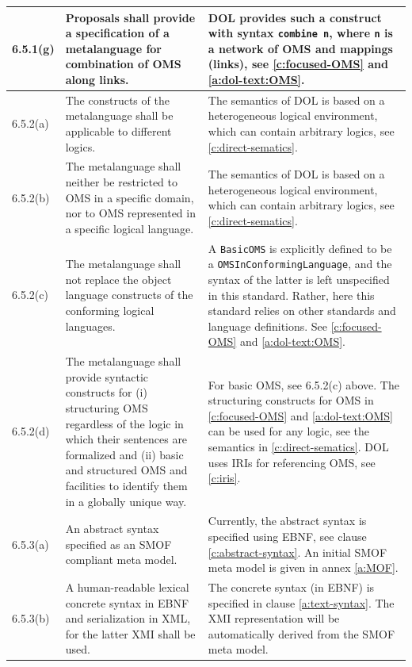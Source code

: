 \documentclass[10pt,fleqn,%
\ifpretendfinal
final%
\else
draft%
\fi,
]{scrreprt}
\newcommand*{\syntax}[1]{\texttt{#1}}
\begin{document}
\begin{center}
\begin{longtable}{|p{}|p{}|p{}|}
	\\ \hline
%
6.5.1(g) & 
Proposals shall provide a specification of a metalanguage for combination of OMS along links. 	&
DOL provides such a construct with syntax \syntax{combine n}, where \syntax{n} is a network of OMS and mappings (links),  see \ref{c:focused-OMS} and \ref{a:dol-text:OMS}.
	\\ \hline
%
6.5.2(a)& 
The constructs of the metalanguage shall be applicable to different logics.	&
The semantics of DOL is based on a heterogeneous logical
environment, which can contain arbitrary logics, see \ref{c:direct-sematics}.
   \\ \hline
%
6.5.2(b)& 
The metalanguage shall neither be restricted to OMS in a specific domain, nor to OMS represented
in a specific logical language.	&
The semantics of DOL is based on a heterogeneous logical
environment, which can contain arbitrary logics, see \ref{c:direct-sematics}.
   \\ \hline
%
6.5.2(c)& 
The metalanguage shall not replace the object language constructs of the conforming logical
languages.	&
A \syntax{BasicOMS} is explicitly defined to be a \syntax{OMSInConformingLanguage}, and the syntax
of the latter is left unspecified in this standard. Rather, here this standard relies on other
standards and language definitions.
See \ref{c:focused-OMS} and \ref{a:dol-text:OMS}.
   \\ \hline
%
6.5.2(d)& 
The metalanguage shall provide syntactic constructs for (i) structuring OMS regardless of the
logic in which their sentences are formalized and (ii) basic and structured OMS and facilities to
identify them in a globally unique way.
	&
For basic OMS, see 6.5.2(c) above.
The structuring constructs for OMS in \ref{c:focused-OMS} and \ref{a:dol-text:OMS} can be used for 
any logic, see the semantics in \ref{c:direct-sematics}. DOL uses IRIs for referencing OMS, see
\ref{c:iris}.
   \\ \hline
%
6.5.3(a)& 
An abstract syntax specified as an SMOF compliant meta model.	&
Currently, the abstract syntax is specified using EBNF, see clause \ref{c:abstract-syntax}. An 
initial SMOF meta model is given in annex \ref{a:MOF}.
   \\ \hline
%
6.5.3(b)& 
A human-readable lexical concrete syntax in EBNF and serialization in XML, for the latter XMI shall
be used.	&
The concrete syntax (in EBNF) is specified in clause \ref{a:text-syntax}. The XMI representation 
will be automatically derived from the SMOF meta model.
   \\ \hline

\end{longtable}
\end{center}
\end{document}
